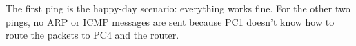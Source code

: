 The first ping is the happy-day scenario: everything works fine.
For the other two pings, no ARP or ICMP messages are sent because PC1 doesn't know how to route the packets to PC4 and the router.